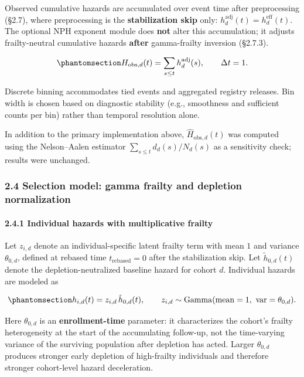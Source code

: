 \documentclass[
]{article}
\begin{document}
Observed cumulative hazards are accumulated over event time after preprocessing (§2.7), where preprocessing is the \textbf{stabilization skip} only: \(h_d^{\mathrm{adj}}(t)=h_d^{\mathrm{eff}}(t)\). The optional NPH exponent module does \textbf{not} alter this accumulation; it adjusts frailty-neutral cumulative hazards \textbf{after} gamma-frailty inversion (§2.7.3).

\begin{equation}\protect\phantomsection\label{eq:cumhazard-observed}{H_{\mathrm{obs},d}(t) = \sum_{s \le t} h_d^{\mathrm{adj}}(s),
\qquad \Delta t = 1.}\end{equation}

Discrete binning accommodates tied events and aggregated registry releases. Bin width is chosen based on diagnostic stability (e.g., smoothness and sufficient counts per bin) rather than temporal resolution alone.

In addition to the primary implementation above, \(\hat H_{\mathrm{obs},d}(t)\) was computed using the Nelson--Aalen estimator \(\sum_{s \le t} d_d(s)/N_d(s)\) as a sensitivity check; results were unchanged.

\subsubsection{2.4 Selection model: gamma frailty and depletion normalization}\label{selection-model-gamma-frailty-and-depletion-normalization}

\paragraph{2.4.1 Individual hazards with multiplicative frailty}\label{individual-hazards-with-multiplicative-frailty}

Let \(z_{i,d}\) denote an individual-specific latent frailty term with mean \(1\) and variance \(\theta_{0,d}\), defined at rebased time \(t_{\mathrm{rebased}}=0\) after the stabilization skip. Let \(\tilde h_{0,d}(t)\) denote the depletion-neutralized baseline hazard for cohort \(d\). Individual hazards are modeled as

\begin{equation}\protect\phantomsection\label{eq:individual-hazard-frailty}{h_{i,d}(t) = z_{i,d}\,\tilde h_{0,d}(t),
\qquad
z_{i,d} \sim \mathrm{Gamma}(\mathrm{mean}=1,\ \mathrm{var}=\theta_{0,d}).}\end{equation}

Here \(\theta_{0,d}\) is an \textbf{enrollment-time} parameter: it characterizes the cohort's frailty heterogeneity at the start of the accumulating follow-up, not the time-varying variance of the surviving population after depletion has acted. Larger \(\theta_{0,d}\) produces stronger early depletion of high-frailty individuals and therefore stronger cohort-level hazard deceleration.
\end{document}
